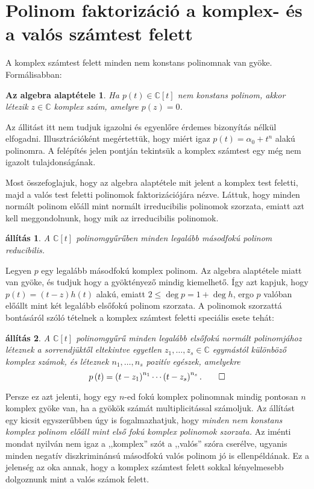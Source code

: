\documentclass[9pt, showtrims]{memoir}
\makeatletter
\renewenvironment{proof}[1][\proofname]
    {\par\pushQED{\qed}%
    \normalfont \topsep6\p@\@plus6\p@\relax
    \trivlist
    \item[\hskip\labelsep
        \itshape
    #1\@addpunct{:}]\ignorespaces}
    {\popQED\endtrivlist\@endpefalse}
\theoremstyle{plain}
\newtheorem{proposition}{állítás}[section]
\newtheorem*{FA}{Az algebra alaptétele}
\theoremstyle{remark}
\theoremstyle{definition}
\makeatother
\begin{document}
\section{Polinom faktorizáció a komplex- és a valós számtest felett}
A komplex számtest felett minden nem konstans polinomnak van gyöke.
Formálisabban:
\begin{FA}
    Ha $p\left( t \right)\in\mathbb{C}[t]$ nem konstans polinom,
    akkor létezik $z\in\mathbb{C}$ komplex szám, 
    amelyre $p\left( z \right)=0$.
\end{FA}
Az állitást itt nem tudjuk igazolni és egyenlőre érdemes bizonyítás nélkül elfogadni.
Illusztrációként megértettük, hogy miért igaz $p\left( t \right)=\alpha_0+t^n$ alakú polinomra.
A felépítés jelen pontján tekintsük a komplex számtest egy még nem igazolt tulajdonságának.

Most összefoglajuk, hogy az algebra alaptétele mit jelent a komplex test feletti, majd a valós test feletti polinomok
faktorizációjára nézve.
Láttuk, hogy minden normált polinom előáll mint normált irreducibilis polinomok szorzata,
emiatt azt kell meggondolnunk, hogy mik az irreducibilis polinomok.
\begin{proposition}
    A $\mathbb{C}\left[ t \right]$ polinomgyűrűben minden legalább másodfokú polinom reducibilis.
\end{proposition}
\begin{proof}
    Legyen $p$ egy legalább másodfokú komplex polinom.
    Az algebra alaptétele miatt van gyöke, és
    tudjuk hogy a gyöktényező mindig kiemelhető.
    Így azt kapjuk, hogy $p(t)=\left( t-z \right)h\left( t \right)$ alakú,
    emiatt $2\leq\deg p=1+\deg h$, ergo
    $p$ valóban előállt mint két legalább elsőfokú polinom szorzata.
\end{proof}
A polinomok szorzattá bontásáról szóló tételnek a komplex számtest feletti speciális esete tehát:
\begin{proposition}\label{pr:PolFact}
    A $\mathbb{C}[t]$ polinomgyűrű minden legalább elsőfokú normált polinomjához léteznek
    a sorrendjüktől eltekintve egyetlen $z_1,\dots,z_s\in\mathbb{C}$ egymástól különböző komplex számok,
    és léteznek $n_1,\dots,n_s$ pozitív egészek, 
    amelyekre
    \[
        p\left( t \right)=
        \left( t-z_1 \right)^{n_1}
        \cdots
        \left( t-z_s\right)^{n_s}.\qedhere
    \]
\end{proposition}
Persze ez azt jelenti, hogy egy $n$-ed fokú komplex polinomnak mindig pontosan $n$ komplex gyöke van, 
ha a gyökök számát multiplicitással számoljuk.
Az állítást egy kicsit egyszerűbben úgy is fogalmazhatjuk, 
hogy 
\emph{
    minden nem konstans komplex polinom előáll mint első fokú komplex polinomok szorzata.
}
Az iménti mondat nyilván nem igaz a ,,komplex'' szót a ,,valós'' szóra cserélve, 
ugyanis minden negatív diszkriminánsú másodfokú valós polinom jó is ellenpéldának.
Ez a jelenség az oka annak, 
hogy a komplex számtest felett sokkal kényelmesebb dolgoznunk mint a valós számok felett.
\end{document}
